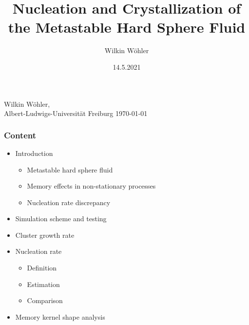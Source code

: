 \documentclass[smaller,notes=hide]{beamer}
\title[Master Colloquium]{\large Nucleation and Crystallization of the
Metastable Hard Sphere Fluid}
\author[W. W\"ohler]{Wilkin W\"ohler}
\institute[]{Universit\"at Freiburg}
\date{14.5.2021}
\newlength{\wideitemsep}
\let\olditem\item
\renewcommand{\item}{\setlength{\itemsep}{\wideitemsep}\olditem}
\begin{document}
\begin{frame}[plain]
  \begin{center}
    \setlength{\fboxsep}{0pt}
      \begin{center}
      \end{center}
    \vfill
    {Wilkin W\"ohler,\\ Albert-Ludwigs-Universit\"at Freiburg}
    \vfill    
    {\small{\today}}
  \end{center}
\end{frame}

\begin{frame}
  \frametitle{Content}
  \begin{itemize}
    \item Introduction
    \begin{itemize}
      \item Metastable hard sphere fluid
      \item Memory effects in non-stationary processes
      \item Nucleation rate discrepancy
    \end{itemize}
    \item Simulation scheme and testing
    \item Cluster growth rate
    \item Nucleation rate
    \begin{itemize}
      \item Definition
      \item Estimation
      \item Comparison
    \end{itemize}
    \item Memory kernel shape analysis
  \end{itemize}
\end{frame}
\end{document}

